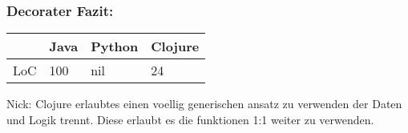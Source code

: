 \documentclass[compress, blue]{beamer}
\begin{document}



\begin{frame}\frametitle{Decorater Fazit:}
    \begin{tabular}{l | l l l}
     & Java &  Python & Clojure  \\
     \hline
    LoC & 100 &  nil & 24  \\
  \end{tabular}
  \begin{block}{Nick: }
    Clojure erlaubtes einen voellig generischen ansatz zu verwenden der
    Daten und Logik trennt. Diese erlaubt es die funktionen 1:1 weiter
    zu verwenden.
  \end{block}
\end{frame}
\end{document}

